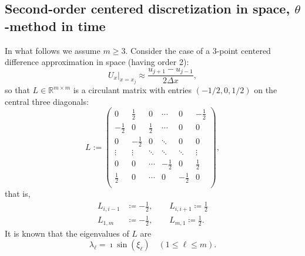\documentclass[a4paper]{article}
\newcommand{\dx}{\Delta x}
\begin{document}
\subsection{Second-order centered discretization in space, \texorpdfstring{$\theta$}{}-method in time}\label{sectioncentered}
In what follows we assume $m \ge 3$. Consider the case of a 3-point centered difference approximation in space (having order 2):
\[
    U_x\Big|_{x=x_j} \approx \frac{u_{j+1}-u_{j-1}}{2\dx},
\]
so that $L\in\mathbb{R}^{m\times m}$ is a circulant matrix with entries $(-1/2, 0, 1/2)$ on the central
three diagonals:
\begin{equation}\label{Ldef}
L:=\left(
\begin{array}{cccccc}
 0 & \frac{1}{2} & 0  & \cdots & 0 & -\frac{1}{2} \\
 -\frac{1}{2} & 0 & \frac{1}{2} &  \cdots & 0 & 0 \\
 0 & -\frac{1}{2} & 0 &  \ddots & 0 & 0\\
 \vdots  & \vdots  & \ddots  & \ddots & \ddots & \vdots \\
  0 & 0 & \cdots  & -\frac{1}{2} & 0 & \frac{1}{2} \\
 \frac{1}{2} & 0 & \cdots & 0 & -\frac{1}{2} & 0 \\
\end{array}
\right),
\end{equation}
that is,
\begin{subequations}
\begin{align}
    L_{i,i-1} & \coloneqq -\frac{1}{2},\quad\quad L_{i,i+1} \coloneqq  \frac{1}{2} \\
    L_{1,m} & \coloneqq -\frac{1}{2}, \quad \quad L_{m,1} \coloneqq \frac{1}{2}.
\end{align}
\end{subequations}
It is known that the eigenvalues of $L$ are 
\begin{equation}\label{Leigenvalues}
\lambda_\ell=\imath \sin(\xi_\ell)\quad (1\le\ell\le m).
\end{equation}
\end{document}
